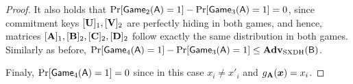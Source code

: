 \begin{proof}
It also holds that $\Pr[\mathsf{Game}_2(\mathsf{A})=1]-\Pr[\mathsf{Game}_3(\mathsf{A})=1]=0$, since commitment keys $[\mathbf{{U}}]_1,[\mathbf{{V}}]_2$ are perfectly hiding in both games, and hence, matrices $[\mathbf{{A}}]_1,[\mathbf{{B}}]_2,[\mathbf{{C}}]_2,[\mathbf{{D}}]_2$ follow exactly the same distribution in both games.
Similarly as before, $\Pr[\mathsf{Game}_4(\mathsf{A})=1]-\Pr[\mathsf{Game}_3(\mathsf{A})=1]\leq\mathbf{Adv}_\mathrm{SXDH}(\mathsf{B})$.

Finaly, $\Pr[\mathsf{Game}_4(\mathsf{A})=1]=0$ since in this case $x_i \neq x'_i$ and $g_{\mathbf{{A}}}({\boldsymbol{x}}) = x_i$.
\end{proof}

